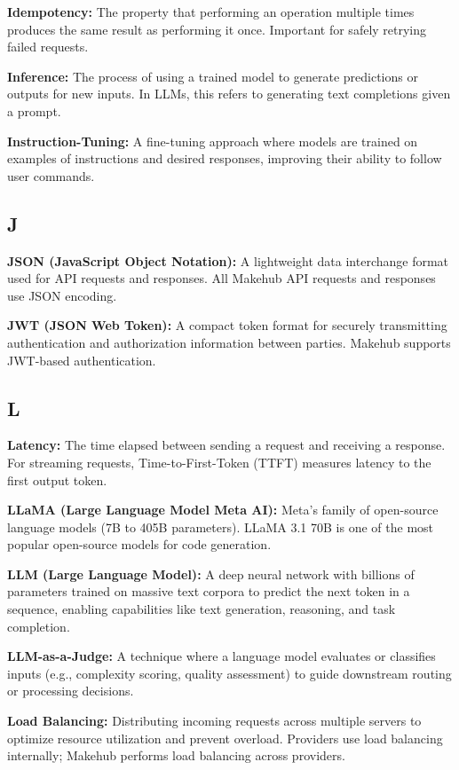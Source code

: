 \documentclass[english]{article}
\begin{document}
\textbf{Idempotency:} The property that performing an operation multiple times produces the same result as performing it once. Important for safely retrying failed requests.

\textbf{Inference:} The process of using a trained model to generate predictions or outputs for new inputs. In LLMs, this refers to generating text completions given a prompt.

\textbf{Instruction-Tuning:} A fine-tuning approach where models are trained on examples of instructions and desired responses, improving their ability to follow user commands.

\subsection*{J}

\textbf{JSON (JavaScript Object Notation):} A lightweight data interchange format used for API requests and responses. All Makehub API requests and responses use JSON encoding.

\textbf{JWT (JSON Web Token):} A compact token format for securely transmitting authentication and authorization information between parties. Makehub supports JWT-based authentication.

\subsection*{L}

\textbf{Latency:} The time elapsed between sending a request and receiving a response. For streaming requests, Time-to-First-Token (TTFT) measures latency to the first output token.

\textbf{LLaMA (Large Language Model Meta AI):} Meta's family of open-source language models (7B to 405B parameters). LLaMA 3.1 70B is one of the most popular open-source models for code generation.

\textbf{LLM (Large Language Model):} A deep neural network with billions of parameters trained on massive text corpora to predict the next token in a sequence, enabling capabilities like text generation, reasoning, and task completion.

\textbf{LLM-as-a-Judge:} A technique where a language model evaluates or classifies inputs (e.g., complexity scoring, quality assessment) to guide downstream routing or processing decisions.

\textbf{Load Balancing:} Distributing incoming requests across multiple servers to optimize resource utilization and prevent overload. Providers use load balancing internally; Makehub performs load balancing across providers.
\end{document}
